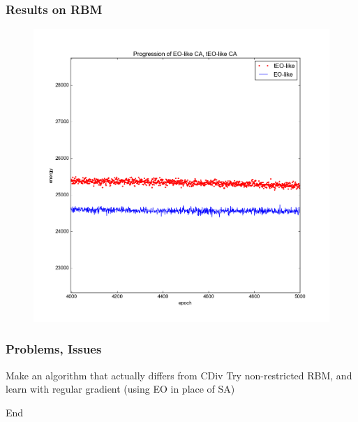 \documentclass{beamer}
\begin{document}
\begin{frame}
  \frametitle{Results on RBM}
  \begin{figure}
    \includegraphics{eo_rbm_zoomed}
  \end{figure}
\end{frame}

\begin{frame}
  \frametitle{Problems, Issues}
  Make an algorithm that actually differs from CDiv
  Try non-restricted RBM, and learn with regular gradient
  (using EO in place of SA)
\end{frame}

\begin{frame}
  End

\end{frame}
\end{document}

